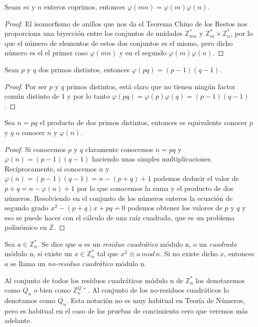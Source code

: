\begin{corollary}
Seam $m$ y $n$ enteros coprimos, entonces $\varphi(mn)=\varphi(m)\varphi(n)$.
\end{corollary}
\begin{proof}
El isomorfismo de anillos que nos da el Teorema Chino de los Restos nos proporciona una
biyecci\'on entre los conjuntos de unidades ${\mathbb Z}_{mn}^*$ y ${\mathbb Z}_m^* \times
{\mathbb Z}_n^*$, por lo que el n\'umero de elementos de estos dos conjuntos es
el mismo, pero dicho n\'umero es el el primer caso $\varphi(mn)$ y en el segundo $\varphi(m)\varphi(n)$.
\end{proof}

\begin{corollary}
Sean $p$ y $q$ dos primos distintos, entonces $\varphi(pq) = (p-1)(q-1)$.
\end{corollary}
\begin{proof}
Por ser $p$ y $q$ primos distintos, est\'a claro que no tienen ning\'un factor
com\'un distinto de $1$ y por lo tanto $\varphi(pq) = \varphi(p)\varphi(q) =
(p-1)(q-1)$.
\end{proof}

\begin{remark}
Sea $n = pq$ el producto de dos primos distintos, entonces es
equivalente conocer $p$ y $q$ o conocer $n$ y $\varphi(n)$.
\end{remark}
\begin{proof}
Si conocemos $p$ y $q$ claramente conocemos $n = pq$ y $\varphi(n) = (p-1)(q-1)$
haciendo unas simples multiplicaciones.
Rec\'iprocamente, si conocemos $n$ y $\varphi(n) = (p-1)(q-1) = n - (p+q) + 1$
podemos deducir el valor de $p+q = n -\varphi(n) + 1$ por lo que conocemos la suma y el
producto de dos n\'umeros. Resolviendo en el conjunto de los n\'umeros enteros
la ecuaci\'on de segundo grado $x^2 -(p+q)x + pq = 0$ podemos obtener los valores
de $p$ y $q$ y eso se puede hacer con el c\'alculo de una ra\'iz cuadrada, que
es un problema polin\'omico en ${\mathbb Z}$.
\end{proof}

\begin{definition}
	Sea $a\in \mathbb{Z}^*_n$. Se dice que $a$ es un \textit{residuo cuadrático}
	módulo n, o un \textit{cuadrado} módulo n, si existe un $x \in \mathbb{Z}^*_n$
	tal que $x^2 \equiv a \, mod \, n$.
	Si no existe dicho $x$, entonces $a$ se llama un \textit{no-residuo cuadrático} módulo n.

	Al conjunto de todos los residuos cuadráticos módulo n de $\mathbb{Z}^*_n$ los
	denotaremos como $Q_n$ o bien como $\mathbb{Z}^{Q+}_n$.
	Al conjunto de los no-residuos cuadráticos lo denotamos como $\overline{Q_n}$.
	Esta notaci\'on no es muy habitual en Teor\'ia de N\'umeros, pero es habitual en el caso de las
	pruebas de concimiento cero que veremos m\'as adelante.
\end{definition}

